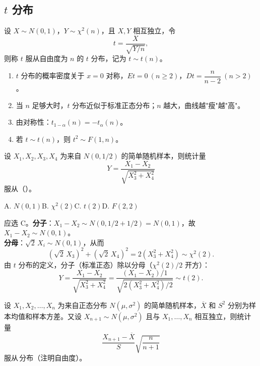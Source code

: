 \documentclass[lang=cn,11pt]{elegantbook}
\begin{document}
\subsection{\texorpdfstring{\(t\)}{t} 分布}

\begin{definition}[\texorpdfstring{\(t\)}{t} 分布] \label{def:t-dist}
设 \(X \sim N(0,1)\)，\(Y \sim \chi^2(n)\)，且 \(X, Y\) 相互独立，令
\[
t = \frac{X}{\sqrt{Y/n}},
\]
则称 \(t\) 服从自由度为 \(n\) 的 \(t\) 分布，记为 \(t \sim t(n)\)。
\end{definition}

\begin{property}\label{prop:t-dist-property} 
\begin{enumerate}
    \item \(t\) 分布的概率密度关于 \(x = 0\) 对称，\(Et = 0\ (n \geq 2)\)，\(Dt = \dfrac{n}{n-2}\ (n > 2)\)。
    \item 当 \(n\) 足够大时，\(t\) 分布近似于标准正态分布；\(n\) 越大，曲线越"瘦"越"高"。
    \item 由对称性：\(t_{1-\alpha}(n) = -t_\alpha(n)\)。
    \item 若 \(t \sim t(n)\)，则 \(t^2 \sim F(1,n)\)。
\end{enumerate}
\end{property}

\begin{exercise} \label{ex:sampling_04}
设 \(X_1,X_2,X_3,X_4\) 为来自 \(N(0,1/2)\) 的简单随机样本，则统计量
\[
Y=\frac{X_1-X_2}{\sqrt{X_3^2+X_4^2}}
\]
服从（\quad）。\par
A. \(N(0,1)\)\qquad B. \(\chi^2(2)\)\qquad C. \(t(2)\)\qquad D. \(F(2,2)\)
\end{exercise}
\begin{solution}
应选 C。\textbf{分子}：\(X_1-X_2\sim N(0,1/2+1/2)=N(0,1)\)，故 \(X_1-X_2\sim N(0,1)\)。\\
\textbf{分母}：\(\sqrt{2}\,X_i\sim N(0,1)\)，从而
\[
(\sqrt{2}\,X_3)^2+(\sqrt{2}\,X_4)^2 = 2(X_3^2+X_4^2)\sim\chi^2(2).
\]
由 \(t\) 分布的定义，分子（标准正态）除以分母（\(\chi^2(2)/2\) 开方）：
\[
Y = \frac{X_1-X_2}{\sqrt{X_3^2+X_4^2}} = \frac{(X_1-X_2)/1}{\sqrt{2(X_3^2+X_4^2)/2}}\sim t(2).
\]
\end{solution}


\begin{exercise}\label{exer:6-t-new}
设 \(X_1, X_2, \dots, X_n\) 为来自正态分布 \(N(\mu, \sigma^2)\) 的简单随机样本，\(\overline{X}\) 和 \(S^2\) 分别为样本均值和样本方差。又设 \(X_{n+1} \sim N(\mu, \sigma^2)\) 且与 \(X_1, \dots, X_n\) 相互独立，则统计量
\[
\frac{X_{n+1} - \overline{X}}{S}\sqrt{\frac{n}{n+1}}
\]
服从\,\underline{\hspace{2cm}}分布（注明自由度）。
\end{exercise}
\end{document}
